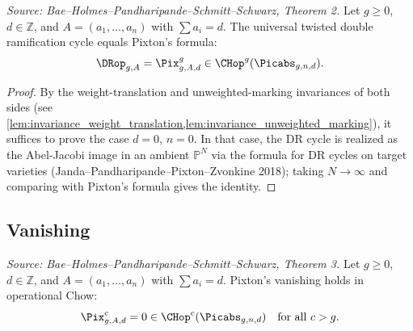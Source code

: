 \begin{theorem}
  \label{thm:main}
  \textit{Source: Bae--Holmes--Pandharipande--Schmitt--Schwarz, Theorem 2.}
  Let $g \geq 0$, $d \in \mathbb{Z}$, and $A = (a_1,\ldots,a_n)$ with $\sum a_i = d$.
  The universal twisted double ramification cycle equals Pixton's formula:
  \[
    \DRop_{g,A} = \Pix^g_{g,A,d} \in \CHop^g(\Picabs_{g,n,d}).
  \]
\end{theorem}

\begin{proof}
  By the weight-translation and unweighted-marking invariances of both sides (see
  \cref{lem:invariance_weight_translation,lem:invariance_unweighted_marking}),
  it suffices to prove the case $d = 0$, $n = 0$.  In that case, the DR cycle is
  realized as the Abel-Jacobi image in an ambient $\mathbb{P}^N$ via the formula
  for DR cycles on target varieties (Janda--Pandharipande--Pixton--Zvonkine 2018);
  taking $N \to \infty$ and comparing with Pixton's formula gives the identity.
\end{proof}

\subsection{Vanishing}

\begin{theorem}[Vanishing]
  \label{thm:vanishing}
  \textit{Source: Bae--Holmes--Pandharipande--Schmitt--Schwarz, Theorem 3.}
  Let $g \geq 0$, $d \in \mathbb{Z}$, and $A = (a_1,\ldots,a_n)$ with $\sum a_i = d$.
  Pixton's vanishing holds in operational Chow:
  \[
    \Pix^c_{g,A,d} = 0 \in \CHop^c(\Picabs_{g,n,d}) \quad \text{for all } c > g.
  \]
\end{theorem}

